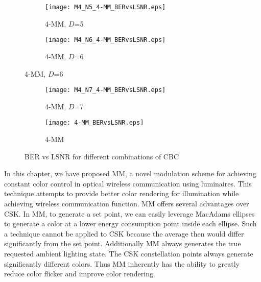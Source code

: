 \begin{figure}[H]
	\centering
		\begin{subfigure}{\textwidth}
		\centering
			\texttt{[image: M4\_N5\_4-MM\_BERvsLSNR.eps]}
			\caption{4-MM, $D$=5}
			\label{fig4MM5L}
		\end{subfigure}
		\begin{subfigure}{\textwidth}
		\centering
			\texttt{[image: M4\_N6\_4-MM\_BERvsLSNR.eps]}
			\caption{4-MM, $D$=6}
			\label{fig4MM6L}
		\end{subfigure}
\end{figure}
\begin{figure}[H]
		\ContinuedFloat
		\begin{subfigure}{\textwidth}
		\centering
			\texttt{[image: M4\_N7\_4-MM\_BERvsLSNR.eps]}
			\caption{4-MM, $D$=7}
			\label{fig4MM7L}
		\end{subfigure}
		\begin{subfigure}{\textwidth}
		\centering
			\texttt{[image: 4-MM\_BERvsLSNR.eps]}
			\caption{4-MM}
			\label{fig4MML}
		\end{subfigure}
	\caption{BER vs LSNR for different combinations of CBC}
	\label{figMM_BERvsLSNR}
\end{figure}

In this chapter, we have proposed MM, a novel modulation scheme for achieving constant color control in optical wireless communication using luminaires. This technique attempts to provide better color rendering for illumination while achieving wireless communication function. MM offers several advantages over CSK. In MM, to generate a set point, we can easily leverage MacAdams ellipses \cite{mac49a} to generate a color at a lower energy consumption point inside each ellipse. Such a technique cannot be applied to CSK because the average then would differ significantly from the set point. Additionally MM always generates the true requested ambient lighting state. The CSK constellation points always generate significantly different colors. Thus MM inherently has the ability to greatly reduce color flicker and improve color rendering. 